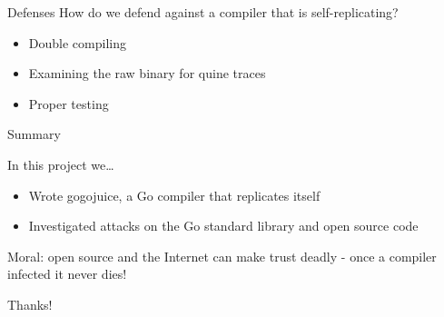 \documentclass{beamer}
\begin{document}
\begin{frame}{Defenses}
How do we defend against a compiler that is self-replicating?
\begin{itemize}
\item Double compiling
\item Examining the raw binary for quine traces
\item Proper testing
\end{itemize}
\end{frame}

\begin{frame}{Summary}

In this project we\dots
  \begin{itemize}
  \item Wrote gogojuice, a Go compiler that replicates itself
  \item Investigated attacks on the Go standard library and open source code
  \end{itemize}

\alert{Moral}: open source and the Internet can make trust deadly - once a compiler infected it never dies!
  
\end{frame}

\begin{frame}
\Huge
Thanks!
\end{frame}
\end{document}
